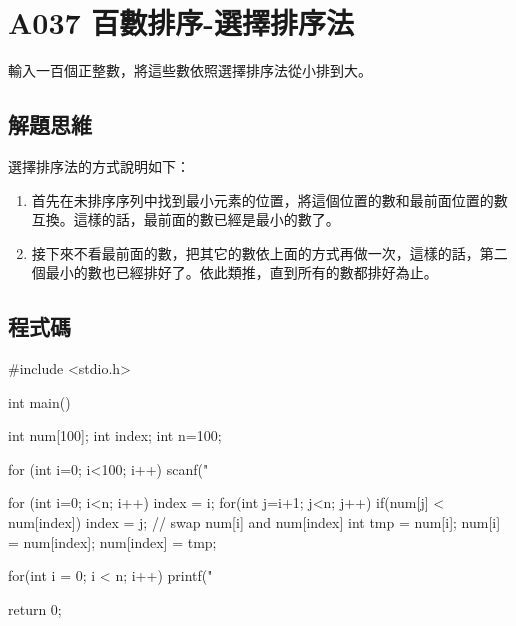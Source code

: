 \section{A037 百數排序-選擇排序法}
輸入一百個正整數，將這些數依照選擇排序法從小排到大。
\subsection{解題思維}
選擇排序法的方式說明如下：
\begin{enumerate}
	\item 首先在未排序序列中找到最小元素的位置，將這個位置的數和最前面位置的數互換。這樣的話，最前面的數已經是最小的數了。
	\item 接下來不看最前面的數，把其它的數依上面的方式再做一次，這樣的話，第二個最小的數也已經排好了。依此類推，直到所有的數都排好為止。
\end{enumerate} 

\subsection{程式碼}
\begin{cppcode}
	#include <stdio.h>
	
	int main()
	{
		int num[100];
		int index;
		int n=100;
		
		for (int i=0; i<100; i++) scanf("%
		
		for (int i=0; i<n; i++) {
			index = i;
			for(int j=i+1; j<n; j++) {
				if(num[j] < num[index]) index = j;
			}
			// swap num[i] and num[index]
			int tmp = num[i];
			num[i] = num[index];
			num[index] = tmp;
		}
		
		for(int i = 0; i < n; i++) printf("%
		
		return 0;
	}
\end{cppcode}
